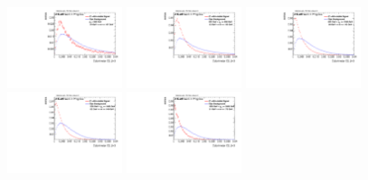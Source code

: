 \begin{figure}[H]
\includegraphics[width=0.3\textwidth]{sascha_input/Appendix/Distributions/higgs/distributions/beta3/h_recoJet_C2_3_bin1.pdf} \hspace{1mm}
\includegraphics[width=0.3\textwidth]{sascha_input/Appendix/Distributions/higgs/distributions/beta3/h_recoJet_C2_3_bin2.pdf} \hspace{4mm}
\includegraphics[width=0.3\textwidth]{sascha_input/Appendix/Distributions/higgs/distributions/beta3/h_recoJet_C2_3_bin3.pdf} 
\bigskip
\includegraphics[width=0.3\textwidth]{sascha_input/Appendix/Distributions/higgs/distributions/beta3/h_recoJet_C2_3_bin4.pdf} \hspace{4mm}
\includegraphics[width=0.3\textwidth]{sascha_input/Appendix/Distributions/higgs/distributions/beta3/h_recoJet_C2_3_bin5.pdf} 


\end{figure}
